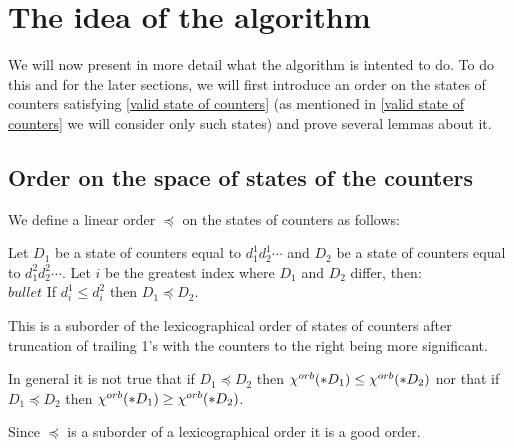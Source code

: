 \section{The idea of the algorithm}\label{the idea of the algoritm}
We will now present in more detail what the algorithm is intented to do. 
To do this and for the later sections, we will first introduce an order on the states 
of counters satisfying \ref{valid state of counters} (as mentioned in 
\ref{valid state of counters} we will consider only such states) and prove several lemmas about it. 
\subsection{Order on the space of states of the counters}
\begin{definition}
We define a linear order $\preceq$ on the states of counters as follows:

Let $D_1$ be a state of counters equal to $d_1^1d_2^1\cdots$ and $D_2$ be a state of counters 
equal to $d_1^2d_2^2\cdots$. Let $i$ be the greatest index where $D_1$ and $D_2$ differ, then:\\
$bullet$ If $d_i^1 \leq d_i^2$ then $D_1 \preceq D_2$. 
\end{definition}

This is a suborder of the lexicographical order 
of states of counters after truncation of trailing 1's 
with the counters to the right being more significant. 

\begin{observation}
In general it is not true that if $D_1 \preceq D_2$ then 
${\chi^{orb}(*D_1)} \leq {\chi^{orb}(*D_2)}$ nor that if $D_1 \preceq D_2$ then 
${\chi^{orb}(*D_1)} \geq {\chi^{orb}(*D_2)}$.
\end{observation}

\begin{observation}\label{good lexicographical order}
Since $\preceq$ is a suborder of a lexicographical order it is a good order. 
\end{observation}

